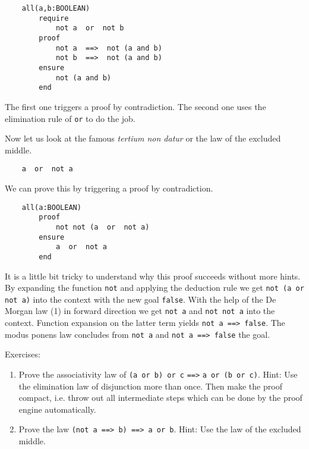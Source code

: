 \begin{lstlisting}
    all(a,b:BOOLEAN)
        require
            not a  or  not b
        proof
            not a  ==>  not (a and b)
            not b  ==>  not (a and b)
        ensure
            not (a and b)
        end
\end{lstlisting}

The first one triggers a proof by contradiction. The second one uses the
elimination rule of \lstinline!or! to do the job.


Now let us look at the famous {\em tertium non datur} or the law of the
excluded middle.
\begin{lstlisting}
    a  or  not a
\end{lstlisting}

We can prove this by triggering a proof by contradiction.

\begin{lstlisting}
    all(a:BOOLEAN)
        proof
            not not (a  or  not a)
        ensure
            a  or  not a
        end
\end{lstlisting}

It is a little bit tricky to understand why this proof succeeds without more
hints. By expanding the function \lstinline!not! and applying the deduction
rule we get \lstinline!not (a or not a)! into the context with the new goal
\lstinline!false!. With the help of the De Morgan law (1) in forward direction
we get \lstinline!not a! and \lstinline!not not a! into the context. Function
expansion on the latter term yields \lstinline!not a ==> false!. The modus
ponens law concludes from \lstinline!not a! and \lstinline!not a ==> false!
the goal.

Exercises:
\begin{enumerate}
\item Prove the associativity law of \lstinline!(a or b) or c! \lstinline!==>!
  \lstinline!a or (b or c)!. Hint: Use the elimination law of disjunction more
  than once. Then  make the proof compact, i.e. throw out all intermediate steps
  which can be done by the proof engine automatically.
\item Prove the law \lstinline!(not a ==> b) ==> a or b!. Hint: Use the
  law of the excluded middle.
\end{enumerate}

